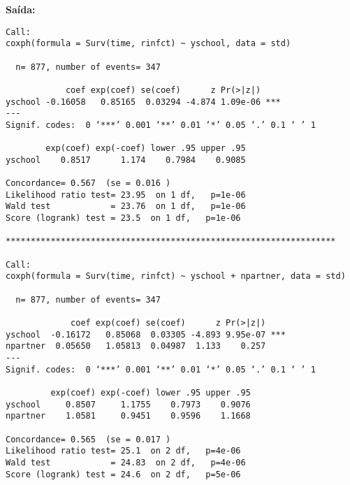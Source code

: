 \documentclass[a4paper,12pt]{article}
\begin{document}
\textbf{Saída:}
\begin{verbatim}
Call:
coxph(formula = Surv(time, rinfct) ~ yschool, data = std)

  n= 877, number of events= 347 

            coef exp(coef) se(coef)      z Pr(>|z|)    
yschool -0.16058   0.85165  0.03294 -4.874 1.09e-06 ***
---
Signif. codes:  0 ‘***’ 0.001 ‘**’ 0.01 ‘*’ 0.05 ‘.’ 0.1 ‘ ’ 1

        exp(coef) exp(-coef) lower .95 upper .95
yschool    0.8517      1.174    0.7984    0.9085

Concordance= 0.567  (se = 0.016 )
Likelihood ratio test= 23.95  on 1 df,   p=1e-06
Wald test            = 23.76  on 1 df,   p=1e-06
Score (logrank) test = 23.5  on 1 df,   p=1e-06

******************************************************************

Call:
coxph(formula = Surv(time, rinfct) ~ yschool + npartner, data = std)

  n= 877, number of events= 347 

             coef exp(coef) se(coef)      z Pr(>|z|)    
yschool  -0.16172   0.85068  0.03305 -4.893 9.95e-07 ***
npartner  0.05650   1.05813  0.04987  1.133    0.257    
---
Signif. codes:  0 ‘***’ 0.001 ‘**’ 0.01 ‘*’ 0.05 ‘.’ 0.1 ‘ ’ 1

         exp(coef) exp(-coef) lower .95 upper .95
yschool     0.8507     1.1755    0.7973    0.9076
npartner    1.0581     0.9451    0.9596    1.1668

Concordance= 0.565  (se = 0.017 )
Likelihood ratio test= 25.1  on 2 df,   p=4e-06
Wald test            = 24.83  on 2 df,   p=4e-06
Score (logrank) test = 24.6  on 2 df,   p=5e-06
\end{verbatim}
\end{document}
